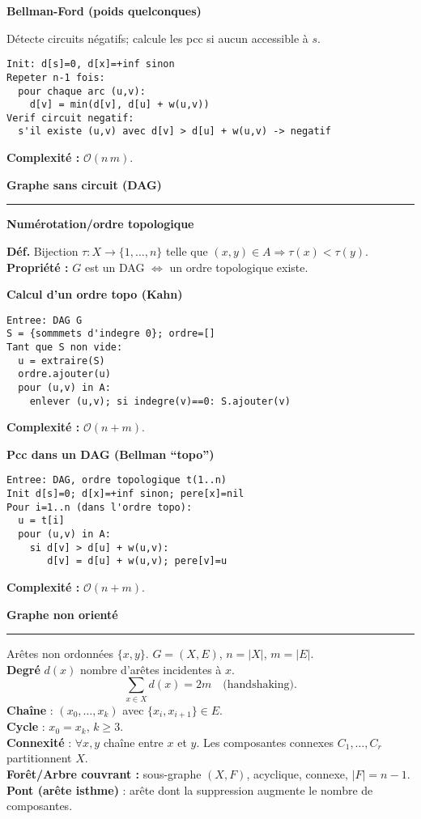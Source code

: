 \documentclass[9pt,a4paper]{article}
\newcommand{\bigO}{\mathcal{O}}
\newcommand{\sect}[1]{\vspace{1ex}\textbf{\large #1}\par\vspace{0.3ex}\hrule\vspace{0.6ex}}
\newcommand{\subsect}[1]{\vspace{0.4ex}\textbf{#1}\par}
\begin{document}
\begin{multicols}{3}
    \subsect{Bellman-Ford (poids quelconques)}
    Détecte circuits négatifs; calcule les pcc si aucun accessible à $s$.
    \begin{lstlisting}[style=tight]
Init: d[s]=0, d[x]=+inf sinon
Repeter n-1 fois:
  pour chaque arc (u,v):
    d[v] = min(d[v], d[u] + w(u,v))
Verif circuit negatif:
  s'il existe (u,v) avec d[v] > d[u] + w(u,v) -> negatif
\end{lstlisting}
    \textbf{Complexité :} $\bigO(n\,m)$.

    \sect{Graphe sans circuit (DAG)}
    \subsect{Numérotation/ordre topologique}
    \textbf{Déf.} Bijection $\tau:X\to\{1,\dots,n\}$ telle que $(x,y)\in A \Rightarrow \tau(x)<\tau(y)$. \\
    \textbf{Propriété :} $G$ est un DAG $\Leftrightarrow$ un ordre topologique existe.

    \subsect{Calcul d’un ordre topo (Kahn)}
    \begin{lstlisting}[style=tight]
Entree: DAG G
S = {sommmets d'indegre 0}; ordre=[]
Tant que S non vide:
  u = extraire(S)
  ordre.ajouter(u)
  pour (u,v) in A:
    enlever (u,v); si indegre(v)==0: S.ajouter(v)
\end{lstlisting}
    \textbf{Complexité :} $\bigO(n+m)$.

    \subsect{Pcc dans un DAG (Bellman “topo”)}
    \begin{lstlisting}[style=tight]
Entree: DAG, ordre topologique t(1..n)
Init d[s]=0; d[x]=+inf sinon; pere[x]=nil
Pour i=1..n (dans l'ordre topo):
  u = t[i]
  pour (u,v) in A:
    si d[v] > d[u] + w(u,v):
       d[v] = d[u] + w(u,v); pere[v]=u
\end{lstlisting}
    \textbf{Complexité :} $\bigO(n+m)$.

    \sect{Graphe non orienté}
    Arêtes non ordonnées $\{x,y\}$. \quad $G=(X,E)$, $n=|X|$, $m=|E|$.\\
    \textbf{Degré} $d(x)$ nombre d’arêtes incidentes à $x$.
    \[
        \sum_{x\in X} d(x)=2m \quad \text{(handshaking)}.
    \]
    \textbf{Chaîne} : $(x_0,\ldots,x_k)$ avec $\{x_i,x_{i+1}\}\in E$. \\
    \textbf{Cycle} : $x_0=x_k$, $k\ge 3$. \\
    \textbf{Connexité} : $\forall x,y$ chaîne entre $x$ et $y$. Les composantes connexes $C_1,\dots,C_r$ partitionnent $X$.\\
    \textbf{Forêt/Arbre couvrant :} sous-graphe $(X,F)$, acyclique, connexe, $|F|=n-1$.\\
    \textbf{Pont (arête isthme)} : arête dont la suppression augmente le nombre de composantes.


\end{multicols}
\end{document}
